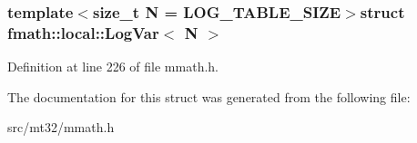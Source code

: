 \subsubsection*{template$<$size\-\_\-t N = L\-O\-G\-\_\-\-T\-A\-B\-L\-E\-\_\-\-S\-I\-Z\-E$>$struct fmath\-::local\-::\-Log\-Var$<$ N $>$}



Definition at line 226 of file mmath.\-h.



The documentation for this struct was generated from the following file\-:\begin{DoxyCompactItemize}
\item 
src/mt32/mmath.\-h\end{DoxyCompactItemize}
